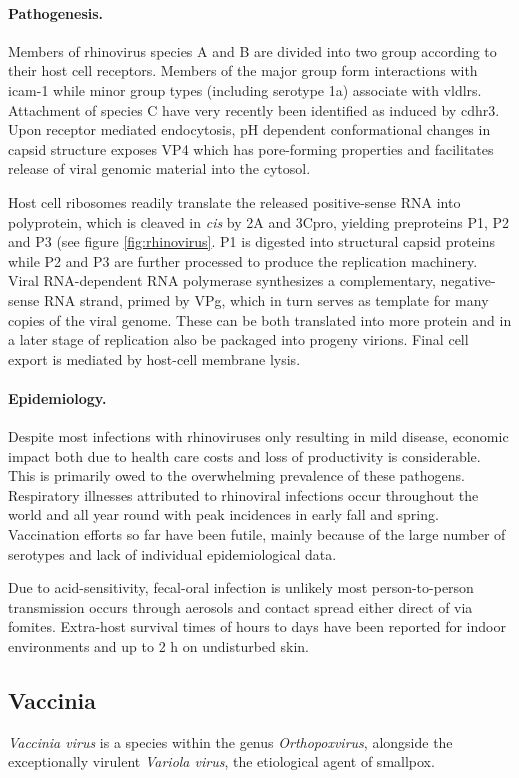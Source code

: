 \paragraph{Pathogenesis.}
Members of rhinovirus species A and B are divided into two group according to their host cell receptors. Members of the major group form interactions with \gls{icam-1} while minor group types (including serotype 1a) associate with \glspl{vldlr}. Attachment of species C have very recently been identified as induced by \gls{cdhr3}. Upon receptor mediated endocytosis, pH dependent conformational changes in capsid structure exposes VP4 which has pore-forming properties and facilitates release of viral genomic material into the cytosol.

Host cell ribosomes readily translate the released positive-sense RNA into polyprotein, which is cleaved in \textit{cis} by 2A and 3Cpro, yielding preproteins P1, P2 and P3 (see figure \ref{fig:rhinovirus}. P1 is digested into structural capsid proteins while P2 and P3 are further processed to produce the replication machinery. Viral RNA-dependent RNA polymerase synthesizes a complementary, negative-sense RNA strand, primed by VPg, which in turn serves as template for many copies of the viral genome. These can be both translated into more protein and in a later stage of replication also be packaged into progeny virions. Final cell export is mediated by host-cell membrane lysis.

\paragraph{Epidemiology.}
Despite most infections with rhinoviruses only resulting in mild disease, economic impact both due to health care costs and loss of productivity is considerable. This is primarily owed to the overwhelming prevalence of these pathogens. Respiratory illnesses attributed to rhinoviral infections occur throughout the world and all year round with peak incidences in early fall and spring. Vaccination efforts so far have been futile, mainly because of the large number of serotypes and lack of individual epidemiological data.

Due to acid-sensitivity, fecal-oral infection is unlikely most person-to-person transmission occurs through aerosols and contact spread either direct of via fomites. Extra-host survival times of hours to days have been reported for indoor environments and up to 2 h on undisturbed skin.

\subsection{Vaccinia}
\textit{Vaccinia virus} is a species within the genus \textit{Orthopoxvirus}, alongside the exceptionally virulent \textit{Variola virus}, the etiological agent of smallpox. 


